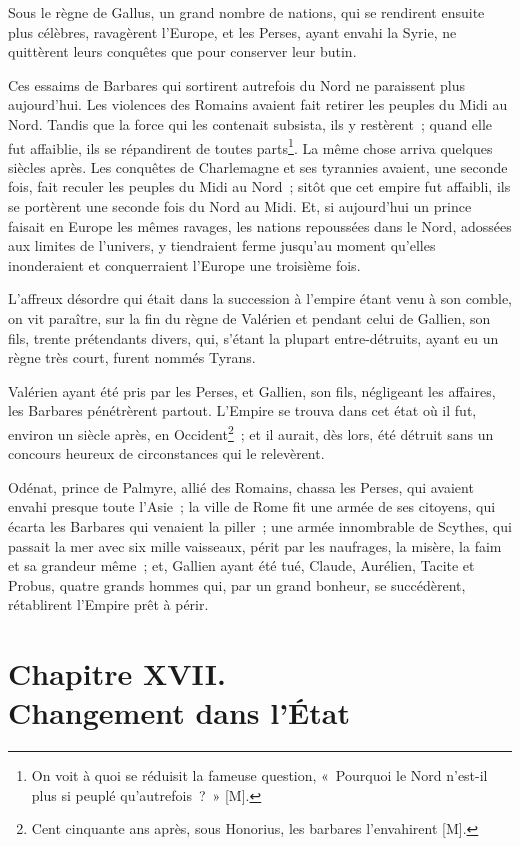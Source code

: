\documentclass[french,twoside]{book} %
\newcommand\chapteropen{} %
\newcommand\chapterclose{} %
\begin{document}
Sous le règne de Gallus, un grand nombre de nations, qui se rendirent ensuite plus célèbres, ravagèrent l’Europe, et les Perses, ayant envahi la Syrie, ne quittèrent leurs conquêtes que pour conserver leur butin.\par
Ces essaims de Barbares qui sortirent autrefois du Nord ne paraissent plus aujourd’hui. Les violences des Romains avaient fait retirer les peuples du Midi au Nord. Tandis que la force qui les contenait subsista, ils y restèrent ; quand elle fut affaiblie, ils se répandirent de toutes parts\footnote{On voit à quoi se réduisit la fameuse question, « Pourquoi le Nord n’est-il plus si peuplé qu’autrefois ? » [M].}. La même chose arriva quelques siècles après. Les conquêtes de Charlemagne et ses tyrannies avaient, une seconde fois, fait reculer les peuples du Midi au Nord ; sitôt que cet empire fut affaibli, ils se portèrent une seconde fois du Nord au Midi. Et, si aujourd’hui un prince faisait en Europe les mêmes ravages, les nations repoussées dans le Nord, adossées aux limites de l’univers, y tiendraient ferme jusqu’au moment qu’elles inonderaient et conquerraient l’Europe une troisième fois.\par
L’affreux désordre qui était dans la succession à l’empire étant venu à son comble, on vit paraître, sur la fin du règne de Valérien et pendant celui de Gallien, son fils, trente prétendants divers, qui, s’étant la plupart entre-détruits, ayant eu un règne très court, furent nommés Tyrans.\par
Valérien ayant été pris par les Perses, et Gallien, son fils, négligeant les affaires, les Barbares pénétrèrent partout. L’Empire se trouva dans cet état où il fut, environ un siècle après, en Occident\footnote{Cent cinquante ans après, sous Honorius, les barbares l’envahirent [M].} ; et il aurait, dès lors, été détruit sans un concours heureux de circonstances qui le relevèrent.\par
Odénat, prince de Palmyre, allié des Romains, chassa les Perses, qui avaient envahi presque toute l’Asie ; la ville de Rome fit une armée de ses citoyens, qui écarta les Barbares qui venaient la piller ; une armée innombrable de Scythes, qui passait la mer avec six mille vaisseaux, périt par les naufrages, la misère, la faim et sa grandeur même ; et, Gallien ayant été tué, Claude, Aurélien, Tacite et Probus, quatre grands hommes qui, par un grand bonheur, se succédèrent, rétablirent l’Empire prêt à périr.
\chapterclose


\chapteropen
\chapter[{Chapitre XVII. Changement dans l’État}]{Chapitre XVII. \\
Changement dans l’État}
\label{considérations\_Romains\_chap\_17}\renewcommand{\leftmark}{Chapitre XVII. \\
Changement dans l’État}
\end{document}
